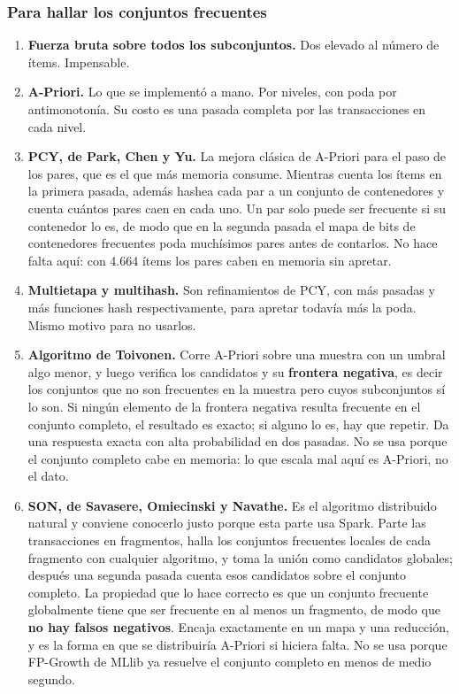 \documentclass[11pt]{article}
\begin{document}
\subsubsection*{Para hallar los conjuntos frecuentes}
\begin{enumerate}
  \item \textbf{Fuerza bruta sobre todos los subconjuntos.} Dos elevado al número de ítems. Impensable.
  \item \textbf{A-Priori.} Lo que se implementó a mano. Por niveles, con poda por antimonotonía. Su costo es una pasada completa por las transacciones en cada nivel.
  \item \textbf{PCY, de Park, Chen y Yu.} La mejora clásica de A-Priori para el paso de los pares, que es el que más memoria consume. Mientras cuenta los ítems en la primera pasada, además hashea cada par a un conjunto de contenedores y cuenta cuántos pares caen en cada uno. Un par solo puede ser frecuente si su contenedor lo es, de modo que en la segunda pasada el mapa de bits de contenedores frecuentes poda muchísimos pares antes de contarlos. No hace falta aquí: con 4.664 ítems los pares caben en memoria sin apretar.
  \item \textbf{Multietapa y multihash.} Son refinamientos de PCY, con más pasadas y más funciones hash respectivamente, para apretar todavía más la poda. Mismo motivo para no usarlos.
  \item \textbf{Algoritmo de Toivonen.} Corre A-Priori sobre una muestra con un umbral algo menor, y luego verifica los candidatos y su \textbf{frontera negativa}, es decir los conjuntos que no son frecuentes en la muestra pero cuyos subconjuntos sí lo son. Si ningún elemento de la frontera negativa resulta frecuente en el conjunto completo, el resultado es exacto; si alguno lo es, hay que repetir. Da una respuesta exacta con alta probabilidad en dos pasadas. No se usa porque el conjunto completo cabe en memoria: lo que escala mal aquí es A-Priori, no el dato.
  \item \textbf{SON, de Savasere, Omiecinski y Navathe.} Es el algoritmo distribuido natural y conviene conocerlo justo porque esta parte usa Spark. Parte las transacciones en fragmentos, halla los conjuntos frecuentes locales de cada fragmento con cualquier algoritmo, y toma la unión como candidatos globales; después una segunda pasada cuenta esos candidatos sobre el conjunto completo. La propiedad que lo hace correcto es que un conjunto frecuente globalmente tiene que ser frecuente en al menos un fragmento, de modo que \textbf{no hay falsos negativos}. Encaja exactamente en un mapa y una reducción, y es la forma en que se distribuiría A-Priori si hiciera falta. No se usa porque FP-Growth de MLlib ya resuelve el conjunto completo en menos de medio segundo.

\end{enumerate}
\end{document}
